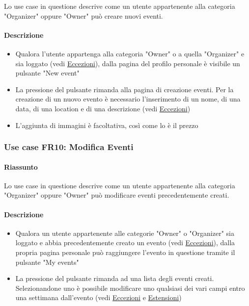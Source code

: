 \documentclass[9pt]{extarticle}
\begin{document}
Lo use case in questione descrive come un utente appartenente alla categoria "Organizer" oppure "Owner" può creare nuovi eventi.

\newpage

\paragraph{Descrizione}

\begin{itemize}
	\item Qualora l'utente appartenga alla categoria "Owner" o a quella "Organizer" e sia loggato (vedi \hyperref[Eccezioni-FR8-10]{Eccezioni}), dalla pagina del profilo personale è visibile un pulsante "New event"
	\item La pressione del pulsante rimanda alla pagina di creazione eventi. Per la creazione di un nuovo evento è necessario l'inserimento di un nome, di una data, di una location e di una descrizione (vedi \hyperref[Eccezioni-FR8-10]{Eccezioni})
	\item L'aggiunta di immagini è facoltativa, così come lo è il prezzo 
\end{itemize}

\subsubsection*{Use case FR10: Modifica Eventi}

\paragraph{Riassunto}

Lo use case in questione descrive come un utente appartenente alla categoria "Organizer" oppure "Owner" può modificare eventi precedentemente creati.

\paragraph{Descrizione}
\begin{itemize}
	\item Qualora un utente appartenente alle categorie "Owner" o "Organizer" sia loggato e abbia precedentemente creato un evento (vedi \hyperref[Eccezioni-FR8-10]{Eccezioni}), dalla propria pagina personale può raggiungere l'evento in questione tramite il pulsante "My events"
	\item La pressione del pulsante rimanda ad una lista degli eventi creati. Selezionandone uno è possibile modificare uno qualsiasi dei vari campi entro una settimana dall'evento (vedi \hyperref[Eccezioni-FR8-10]{Eccezioni} e \hyperref[Estensioni-FR8-10]{Estensioni})
\end{itemize}
\end{document}
